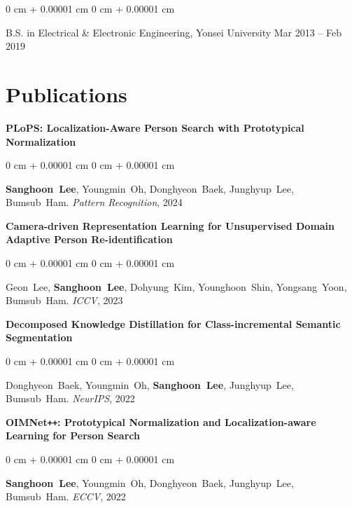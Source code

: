 \documentclass[10pt, letterpaper]{article}
\newenvironment{onecolentry}{
    \begin{adjustwidth}{
        0 cm + 0.00001 cm
    }{
        0 cm + 0.00001 cm
    }
}{
    \end{adjustwidth}
} %
\newenvironment{twocolentry}[2][]{
    \onecolentry
    \def\secondColumn{#2}
    \setcolumnwidth{\fill, 4.5 cm}
    \begin{paracol}{2}
}{
    \switchcolumn \raggedleft \secondColumn
    \end{paracol}
    \endonecolentry
} %
\begin{document}
        \begin{twocolentry}{Mar 2013 – Feb 2019}
        B.S. in Electrical \& Electronic Engineering, Yonsei University\end{twocolentry}
        \vspace{0.10 cm}
    
    \section{Publications}
    	\textbf{PLoPS: Localization-Aware Person Search with Prototypical Normalization}
        \begin{onecolentry}
        \mbox{\textbf{Sanghoon Lee}}, \mbox{Youngmin Oh}, \mbox{Donghyeon Baek}, \mbox{Junghyup Lee}, \mbox{Bumsub Ham}.\newline
       	\textit{Pattern Recognition}, 2024
        \end{onecolentry}
        \vspace{0.10 cm}
        
        \textbf{Camera-driven Representation Learning for Unsupervised Domain Adaptive Person Re-identification}
        \begin{onecolentry}
        \mbox{Geon Lee}, \mbox{\textbf{Sanghoon Lee}}, \mbox{Dohyung Kim}, \mbox{Younghoon Shin}, \mbox{Yongsang Yoon}, \mbox{Bumsub Ham}.\newline
       	\textit{ICCV}, 2023
        \end{onecolentry}
        \vspace{0.10 cm}
        
        \textbf{Decomposed Knowledge Distillation for Class-incremental Semantic Segmentation}
        \begin{onecolentry}
        \mbox{Donghyeon Baek}, \mbox{Youngmin Oh}, \mbox{\textbf{Sanghoon Lee}}, \mbox{Junghyup Lee}, \mbox{Bumsub Ham}.\newline
        \textit{NeurIPS}, 2022
        \end{onecolentry}
        \vspace{0.10 cm}
        
        \textbf{OIMNet\texttt{++}: Prototypical Normalization and Localization-aware Learning for Person Search}
        \begin{onecolentry}
        \mbox{\textbf{Sanghoon Lee}}, \mbox{Youngmin Oh}, \mbox{Donghyeon Baek}, \mbox{Junghyup Lee}, \mbox{Bumsub Ham}.\newline
       	\textit{ECCV}, 2022
        \end{onecolentry}
        \vspace{0.10 cm}
        
\end{document}
